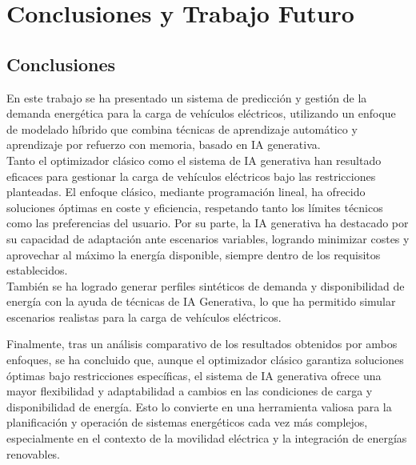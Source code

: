 \chapter{Conclusiones y Trabajo Futuro}
\section{Conclusiones}
En este trabajo se ha presentado un sistema de predicción y gestión de la demanda energética para 
la carga de vehículos eléctricos, utilizando un enfoque de modelado híbrido que combina técnicas 
de aprendizaje automático y aprendizaje por refuerzo con memoria, basado en IA generativa.\\

Tanto el optimizador clásico como el sistema de IA generativa han resultado eficaces para gestionar 
la carga de vehículos eléctricos bajo las restricciones planteadas. El enfoque clásico, mediante 
programación lineal, ha ofrecido soluciones óptimas en coste y eficiencia, respetando tanto los 
límites técnicos como las preferencias del usuario. Por su parte, la IA generativa ha destacado por 
su capacidad de adaptación ante escenarios variables, logrando minimizar costes y aprovechar al 
máximo la energía disponible, siempre dentro de los requisitos establecidos.\\

También se ha logrado generar perfiles sintéticos de demanda y disponibilidad de energía con la 
ayuda de técnicas de IA Generativa, lo que ha permitido simular escenarios realistas para la carga 
de vehículos eléctricos.

Finalmente, tras un análisis comparativo de los resultados obtenidos por ambos enfoques, se ha
concluido que, aunque el optimizador clásico garantiza soluciones óptimas bajo restricciones
específicas, el sistema de IA generativa ofrece una mayor flexibilidad y adaptabilidad a cambios
en las condiciones de carga y disponibilidad de energía. Esto lo convierte en una herramienta valiosa
para la planificación y operación de sistemas energéticos cada vez más complejos, especialmente en
el contexto de la movilidad eléctrica y la integración de energías renovables.\\

